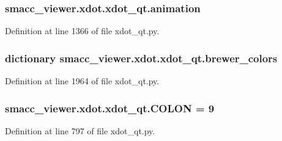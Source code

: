 \subsubsection[{\texorpdfstring{animation}{animation}}]{\setlength{\rightskip}{0pt plus 5cm}smacc\+\_\+viewer.\+xdot.\+xdot\+\_\+qt.\+animation}\hypertarget{namespacesmacc__viewer_1_1xdot_1_1xdot__qt_a564fb2ac32707a20c9ba6556130e9029}{}\label{namespacesmacc__viewer_1_1xdot_1_1xdot__qt_a564fb2ac32707a20c9ba6556130e9029}


Definition at line 1366 of file xdot\+\_\+qt.\+py.

\subsubsection[{\texorpdfstring{brewer\+\_\+colors}{brewer_colors}}]{\setlength{\rightskip}{0pt plus 5cm}dictionary smacc\+\_\+viewer.\+xdot.\+xdot\+\_\+qt.\+brewer\+\_\+colors}\hypertarget{namespacesmacc__viewer_1_1xdot_1_1xdot__qt_af791111d29bdaa6facb116ad1989b5a6}{}\label{namespacesmacc__viewer_1_1xdot_1_1xdot__qt_af791111d29bdaa6facb116ad1989b5a6}


Definition at line 1964 of file xdot\+\_\+qt.\+py.

\subsubsection[{\texorpdfstring{C\+O\+L\+ON}{COLON}}]{ smacc\+\_\+viewer.\+xdot.\+xdot\+\_\+qt.\+C\+O\+L\+ON = 9}\hypertarget{namespacesmacc__viewer_1_1xdot_1_1xdot__qt_abe43e930f56b018f7dc671b85e870d27}{}\label{namespacesmacc__viewer_1_1xdot_1_1xdot__qt_abe43e930f56b018f7dc671b85e870d27}


Definition at line 797 of file xdot\+\_\+qt.\+py.


